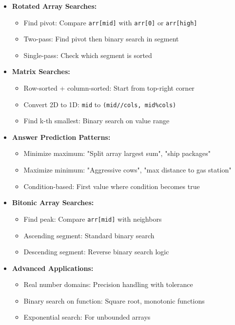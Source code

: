 \documentclass[a4paper,10pt]{book}
\begin{document}
\begin{itemize}
    \item \textbf{Rotated Array Searches:}
    \begin{itemize}
        \item Find pivot: Compare \texttt{arr[mid]} with \texttt{arr[0]} or \texttt{arr[high]}
        \item Two-pass: Find pivot then binary search in segment
        \item Single-pass: Check which segment is sorted
    \end{itemize}
    
    \item \textbf{Matrix Searches:}
    \begin{itemize}
        \item Row-sorted + column-sorted: Start from top-right corner
        \item Convert 2D to 1D: \texttt{mid} to \texttt{(mid//cols, mid\%cols)}
        \item Find k-th smallest: Binary search on value range
    \end{itemize}
    
    \item \textbf{Answer Prediction Patterns:}
    \begin{itemize}
        \item Minimize maximum: "Split array largest sum", "ship packages"
        \item Maximize minimum: "Aggressive cows", "max distance to gas station"
        \item Condition-based: First value where condition becomes true
    \end{itemize}
    
    \item \textbf{Bitonic Array Searches:}
    \begin{itemize}
        \item Find peak: Compare \texttt{arr[mid]} with neighbors
        \item Ascending segment: Standard binary search
        \item Descending segment: Reverse binary search logic
    \end{itemize}
    
    \item \textbf{Advanced Applications:}
    \begin{itemize}
        \item Real number domains: Precision handling with tolerance
        \item Binary search on function: Square root, monotonic functions
        \item Exponential search: For unbounded arrays
    \end{itemize}
    

\end{itemize}
\end{document}
